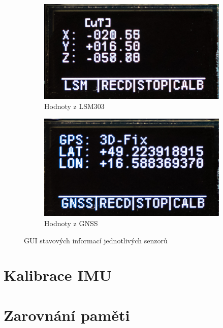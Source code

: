 \begin{figure}[h]
\begin{subfigure}[b]{0.29\textwidth}
     \end{subfigure}
     \centering
     \begin{subfigure}[b]{0.29\textwidth}
         \centering
         \includegraphics[width=\textwidth]{obrazky/menuLSM}
         \caption{Hodnoty z LSM303}
       
     \end{subfigure}
		\hfill
     \begin{subfigure}[b]{0.29\textwidth}
         \centering
         \includegraphics[width=\textwidth]{obrazky/menuGPS}
         \caption{Hodnoty z GNSS}
         
     \end{subfigure}

        \caption{GUI stavových informací jednotlivých senzorů}
        \label{fig:stateInfoGUI}
\end{figure}




\section{Kalibrace IMU}
\section{Zarovnání paměti}



